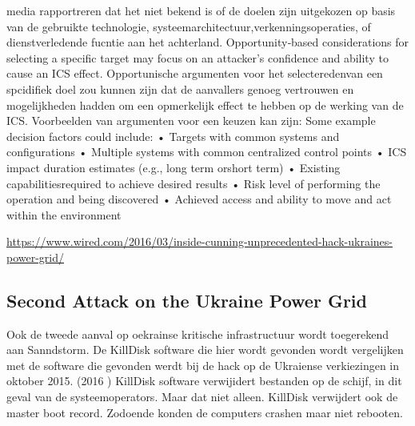 		media rapportreren dat het niet bekend is of de doelen zijn uitgekozen op basis van de gebruikte
		technologie, systeemarchitectuur,verkenningsoperaties, of dienstverledende fucntie aan het
		achterland.
		Opportunity‐based considerations for selecting a specific target may focus on an attacker’s
		confidence and ability to cause an ICS effect. Opportunische argumenten voor het selecteredenvan
		een spcidifiek doel zou kunnen zijn dat de aanvallers genoeg vertrouwen en mogelijkheden hadden
		om een opmerkelijk effect te hebben op de werking van de ICS.
		Voorbeelden van argumenten voor een keuzen kan zijn:
		Some example decision factors could include:
		• Targets with common systems and configurations
		• Multiple systems with common centralized control points
		• ICS impact duration estimates (e.g., long term orshort term)
		• Existing capabilitiesrequired to achieve desired results
		• Risk level of performing the operation and being discovered
		• Achieved access and ability to move and act within the environment
		
		\url{https://www.wired.com/2016/03/inside-cunning-unprecedented-hack-ukraines-power-grid/}
		
		\subsection{Second Attack on the Ukraine Power Grid}
		
		
		Ook de tweede aanval op oekrainse kritische infrastructuur wordt toegerekend aan Sanndstorm. De
		KillDisk software die hier wordt gevonden wordt vergelijken met de software die gevonden werdt bij
		de hack op de Ukraiense verkiezingen in oktober 2015. (2016 ) KillDisk software verwijidert
		bestanden op de schijf, in dit geval van de systeemoperators. Maar dat niet alleen. KillDisk verwijdert
		ook de master boot record. Zodoende konden de computers crashen maar niet rebooten.
		
